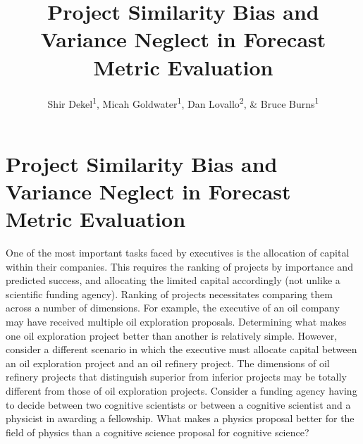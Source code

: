 \documentclass[
  english,
  man, donotrepeattitle,floatsintext]{apa7}
\title{Project Similarity Bias and Variance Neglect in Forecast Metric Evaluation}
\author{Shir Dekel\textsuperscript{1}, Micah Goldwater\textsuperscript{1}, Dan Lovallo\textsuperscript{2}, \& Bruce Burns\textsuperscript{1}}
\date{}
\affiliation{\vspace{0.5cm}\textsuperscript{1} The University of Sydney, School of Psychology\\\textsuperscript{2} The University of Sydney, Business School}
\theoremstyle{definition}
\theoremstyle{definition}
\theoremstyle{definition}
\theoremstyle{definition}
\theoremstyle{remark}
\begin{document}
\maketitle






















\hypertarget{project-similarity-bias-and-variance-neglect-in-forecast-metric-evaluation}{%
\section{Project Similarity Bias and Variance Neglect in Forecast Metric Evaluation}\label{project-similarity-bias-and-variance-neglect-in-forecast-metric-evaluation}}

One of the most important tasks faced by executives is the allocation of capital
within their companies. This requires the ranking of projects by importance and
predicted success, and allocating the limited capital accordingly (not unlike a
scientific funding agency). Ranking of projects necessitates comparing them
across a number of dimensions. For example, the executive of an oil company may
have received multiple oil exploration proposals. Determining what makes one oil
exploration project better than another is relatively simple. However, consider
a different scenario in which the executive must allocate capital between an oil
exploration project and an oil refinery project. The dimensions of oil refinery
projects that distinguish superior from inferior projects may be totally
different from those of oil exploration projects. Consider a funding agency
having to decide between two cognitive scientists or between a cognitive
scientist and a physicist in awarding a fellowship. What makes a physics
proposal better for the field of physics than a cognitive science proposal for
cognitive science?
\end{document}
